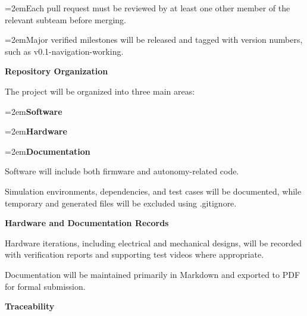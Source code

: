 \documentclass[12pt,a4paper]{article}
\begin{document}
\par\noindent\hangindent=2em\hspace*{1em}\textbullet\hspace{0.5em}Each pull request must be reviewed by at least one other member of the relevant subteam before merging.\par
\par\noindent\hangindent=2em\hspace*{1em}\textbullet\hspace{0.5em}Major verified milestones will be released and tagged with version numbers, such as v0.1-navigation-working.\par
\par\medskip\noindent\textbf{Repository Organization}\par\smallskip
\noindent The project will be organized into three main areas:\par
\par\noindent\hangindent=2em\hspace*{1em}\textbullet\hspace{0.5em}\textbf{Software}\par
\par\noindent\hangindent=2em\hspace*{1em}\textbullet\hspace{0.5em}\textbf{Hardware}\par
\par\noindent\hangindent=2em\hspace*{1em}\textbullet\hspace{0.5em}\textbf{Documentation}\par
\noindent Software will include both firmware and autonomy-related code.\par
\noindent Simulation environments, dependencies, and test cases will be documented, while temporary and generated files will be excluded using .gitignore.\par
\par\medskip\noindent\textbf{Hardware and Documentation Records}\par\smallskip
\noindent Hardware iterations, including electrical and mechanical designs, will be recorded with verification reports and supporting test videos where appropriate.\par
\noindent Documentation will be maintained primarily in Markdown and exported to PDF for formal submission.\par
\par\medskip\noindent\textbf{Traceability}\par\smallskip
\end{document}
